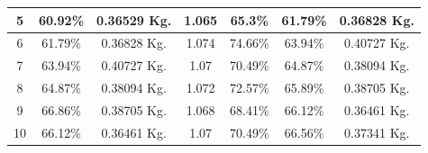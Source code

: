 \begin{longtable}{|p{1cm}|p{1.7cm}|p{2cm}|p{2cm}|p{2cm}| p{1cm}| p{1cm}|}
             \multicolumn{1}{|c|}{5} 
             & \multicolumn{1}{c|}{60.92\%}  
             & \multicolumn{1}{c|}{0.36529 Kg.} 
             & \multicolumn{1}{c|}{1.065}
             & \multicolumn{1}{c|}{65.3\%} 
             & \multicolumn{1}{c|}{61.79\%}             
             & \multicolumn{1}{c|}{0.36828 Kg.} \\
             \hline
             
             \multicolumn{1}{|c|}{6} 
             & \multicolumn{1}{c|}{61.79\%}  
             & \multicolumn{1}{c|}{0.36828 Kg.} 
             & \multicolumn{1}{c|}{1.074}
             & \multicolumn{1}{c|}{74.66\%} 
             & \multicolumn{1}{c|}{63.94\%}             
             & \multicolumn{1}{c|}{0.40727 Kg.} \\
             \hline
             
             \multicolumn{1}{|c|}{7} 
             & \multicolumn{1}{c|}{63.94\%}  
             & \multicolumn{1}{c|}{0.40727 Kg.} 
             & \multicolumn{1}{c|}{1.07}
             & \multicolumn{1}{c|}{70.49\%} 
             & \multicolumn{1}{c|}{64.87\%}
             & \multicolumn{1}{c|}{0.38094 Kg.} \\
             \hline
             
             \multicolumn{1}{|c|}{8} 
             & \multicolumn{1}{c|}{64.87\%}  
             & \multicolumn{1}{c|}{0.38094 Kg.} 
             & \multicolumn{1}{c|}{1.072}
             & \multicolumn{1}{c|}{72.57\%}
             & \multicolumn{1}{c|}{65.89\%}
             & \multicolumn{1}{c|}{0.38705 Kg.} \\
             \hline
             
             \multicolumn{1}{|c|}{9} 
             & \multicolumn{1}{c|}{66.86\%}  
             & \multicolumn{1}{c|}{0.38705 Kg.} 
             & \multicolumn{1}{c|}{1.068}
             & \multicolumn{1}{c|}{68.41\%}
             & \multicolumn{1}{c|}{66.12\%}
             & \multicolumn{1}{c|}{0.36461 Kg.} \\
             \hline
             
             \multicolumn{1}{|c|}{10} 
             & \multicolumn{1}{c|}{66.12\%} 
             & \multicolumn{1}{c|}{0.36461 Kg.} 
             & \multicolumn{1}{c|}{1.07}
             & \multicolumn{1}{c|}{70.49\%}
             & \multicolumn{1}{c|}{66.56\%}
             & \multicolumn{1}{c|}{0.37341 Kg.} \\
             \hline
        
    \end{longtable}
    
